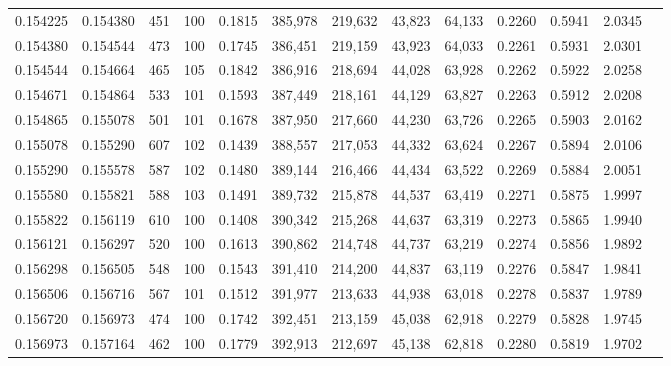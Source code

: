 \begin{tabular}{rrrrrrrrrrrrr}
0.154225 & 0.154380 &   451 & 100 &                                     0.1815 & 385,978 & 219,632 &  43,823 &  64,133 & 0.2260 & 0.5941 & 2.0345 \\
0.154380 & 0.154544 &   473 & 100 &                                     0.1745 & 386,451 & 219,159 &  43,923 &  64,033 & 0.2261 & 0.5931 & 2.0301 \\
0.154544 & 0.154664 &   465 & 105 &                                     0.1842 & 386,916 & 218,694 &  44,028 &  63,928 & 0.2262 & 0.5922 & 2.0258 \\
0.154671 & 0.154864 &   533 & 101 &                                     0.1593 & 387,449 & 218,161 &  44,129 &  63,827 & 0.2263 & 0.5912 & 2.0208 \\
0.154865 & 0.155078 &   501 & 101 &                                     0.1678 & 387,950 & 217,660 &  44,230 &  63,726 & 0.2265 & 0.5903 & 2.0162 \\
0.155078 & 0.155290 &   607 & 102 &                                     0.1439 & 388,557 & 217,053 &  44,332 &  63,624 & 0.2267 & 0.5894 & 2.0106 \\
0.155290 & 0.155578 &   587 & 102 &                                     0.1480 & 389,144 & 216,466 &  44,434 &  63,522 & 0.2269 & 0.5884 & 2.0051 \\
0.155580 & 0.155821 &   588 & 103 &                                     0.1491 & 389,732 & 215,878 &  44,537 &  63,419 & 0.2271 & 0.5875 & 1.9997 \\
0.155822 & 0.156119 &   610 & 100 &                                     0.1408 & 390,342 & 215,268 &  44,637 &  63,319 & 0.2273 & 0.5865 & 1.9940 \\
0.156121 & 0.156297 &   520 & 100 &                                     0.1613 & 390,862 & 214,748 &  44,737 &  63,219 & 0.2274 & 0.5856 & 1.9892 \\
0.156298 & 0.156505 &   548 & 100 &                                     0.1543 & 391,410 & 214,200 &  44,837 &  63,119 & 0.2276 & 0.5847 & 1.9841 \\
0.156506 & 0.156716 &   567 & 101 &                                     0.1512 & 391,977 & 213,633 &  44,938 &  63,018 & 0.2278 & 0.5837 & 1.9789 \\
0.156720 & 0.156973 &   474 & 100 &                                     0.1742 & 392,451 & 213,159 &  45,038 &  62,918 & 0.2279 & 0.5828 & 1.9745 \\
0.156973 & 0.157164 &   462 & 100 &                                     0.1779 & 392,913 & 212,697 &  45,138 &  62,818 & 0.2280 & 0.5819 & 1.9702 \\

\end{tabular}
